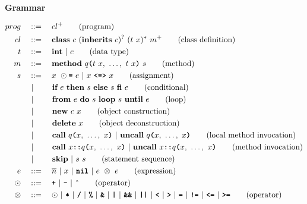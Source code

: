 \begin{figure}[h]
\centering

\vspace{3mm}
\textbf{\rooplpp Grammar}

\begin{align}
    prog		\quad&::= \quad cl^+ \tag{program}\\
    cl			\quad&::=\quad \textbf{class}\ c\ (\textbf{inherits}\ c)^?\ (t\ x)^*\ m^+\tag{class definition}\\
    t			\quad&::=\quad \textbf{int}\ |\ c\tag{data type}\\
    m			\quad&::=\quad \textbf{method}\ q\textbf{\texttt{(}}t\ x,\ \dots,\ t\ x\textbf{\texttt{)}}\ s\tag{method}\\
    s			\quad&::=\quad x\ \odot\textbf{\texttt{=}}\ e\ |\ x\ \textbf{\texttt{<=>}}\ x\tag{assignment}\\
    			&\ |\ \qquad \textbf{if}\ e\ \textbf{then}\ s\ \textbf{else}\ s\ \textbf{fi}\ e\tag{conditional}\\
    			&\ |\ \qquad \textbf{from}\ e\ \textbf{do}\ s\ \textbf{loop}\ s\ \textbf{until}\ e\tag{loop}\\
    			&\ |\ \qquad \textbf{new}\ c\ x  \tag{object construction}\\
    			&\ |\ \qquad \textbf{delete}\ x \tag{object deconstruction}\\
    			&\ |\ \qquad \textbf{call}\ q\textbf{\texttt{(}}x,\ \dots,\ x\textbf{\texttt{)}}\ |\ \textbf{uncall}\ q\textbf{\texttt{(}}x,\ \dots,\ x\textbf{\texttt{)}}\tag{local method invocation}\\
    			&\ |\ \qquad \textbf{call}\ x\textbf{\texttt{::}}q\textbf{\texttt{(}}x,\ \dots,\ x\textbf{\texttt{)}}\ |\ \textbf{uncall}\ x\textbf{\texttt{::}}q\textbf{\texttt{(}}x,\ \dots,\ x\textbf{\texttt{)}}\tag{method invocation}\\
    			&\ |\ \qquad \textbf{skip}\ |\ s\ s\tag{statement sequence}\\
    e			\quad&::=\quad \overline{n}\ |\ x\ |\ \textbf{\texttt{nil}}\ |\ e\ \otimes\ e\tag{expression}\\
    \odot	\quad&::=\quad \textbf{\texttt{+}}\ |\ \textbf{\texttt{-}}\ |\ \textbf{\texttt{\^}}\tag{operator}\\
    \otimes\quad&::=\quad \odot\ |\ \textbf{\texttt{*}}\ |\ \textbf{\texttt{/}}\ |\ \textbf{\texttt{\%}}\ |\ \textbf{\texttt{\&}}\ |\ \textbf{\texttt{|}}\ |\ \textbf{\texttt{\&\&}}\ |\ \textbf{\texttt{||}}\ |\ \textbf{\texttt{<}}\ |\ \textbf{\texttt{\textgreater}}\ |\ \textbf{\texttt{=}}\ |\ \textbf{\texttt{!=}}\ |\ \textbf{\texttt{<=}}\ |\ \textbf{\texttt{\textgreater=}}\tag{operator}
\end{align}


\end{figure}
